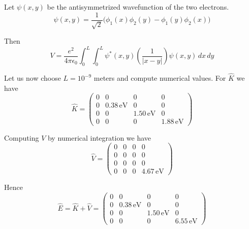 \documentclass[12pt]{article}
\begin{document}
Let $\psi(x,y)$ be the antisymmetrized wavefunction of the two electrons.
\begin{equation*}
\psi(x,y)=\frac{1}{\sqrt{2}}\big(\phi_1(x)\phi_2(y)-\phi_1(y)\phi_2(x)\big)
\end{equation*}

Then
\begin{equation*}
V=\frac{e^2}{4\pi\epsilon_0}\int_0^L\int_0^L
\psi^*(x,y)\left(\frac{1}{|x-y|}\right)\psi(x,y)\,dx\,dy
\end{equation*}

Let us now choose $L=10^{-9}$ meters and compute numerical values.
For $\hat{K}$ we have
\begin{equation*}
\hat{K}=\begin{pmatrix}
0 & 0 & 0 & 0\\
0 & 0.38\,\text{eV} & 0 & 0\\
0 & 0 & 1.50\,\text{eV} & 0\\
0 & 0 & 0 & 1.88\,\text{eV}
\end{pmatrix}
\end{equation*}

Computing $V$ by numerical integration we have
\begin{equation*}
\hat{V}=\begin{pmatrix}
0 & 0 & 0 & 0\\
0 & 0 & 0 & 0\\
0 & 0 & 0 & 0\\
0 & 0 & 0 & 4.67\,\text{eV}
\end{pmatrix}
\end{equation*}

Hence
\begin{equation*}
\hat{E}=\hat{K}+\hat{V}=\begin{pmatrix}
0 & 0 & 0 & 0\\
0 & 0.38\,\text{eV} & 0 & 0\\
0 & 0 & 1.50\,\text{eV} & 0\\
0 & 0 & 0 & 6.55\,\text{eV}
\end{pmatrix}
\end{equation*}
\end{document}

